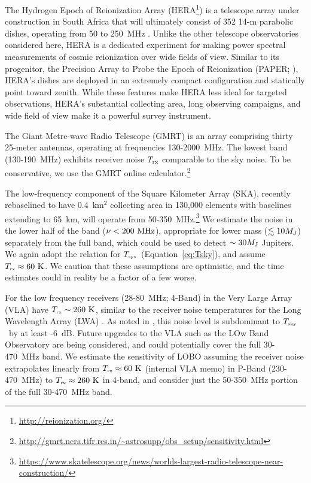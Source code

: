 \documentclass[iop,numberedappendix,apj,twocolappendix,]{emulateapj}
\newcommand{\Tsky}{\mbox{$T_{\mbox{\tiny sky}}$}}
\newcommand{\Tsys}{\mbox{$T_{\mbox{\tiny sys}}$}}
\newcommand{\Trx}{\mbox{$T_{\mbox{\tiny rx}}$}}
\begin{document}
The Hydrogen Epoch of Reionization Array (HERA\footnote{\url{http://reionization.org/}}) is a telescope array under construction in South Africa that will ultimately consist of 352 14-m parabolic dishes, operating from 50 to 250~MHz \citep{pober_et_al2014}.
Unlike the other telescope observatories considered here, HERA is a dedicated experiment for making power spectral measurements of cosmic reionization over wide fields of view.
Similar to its progenitor, the Precision Array to Probe the Epoch of Reionization (PAPER; \citealt{parsons_et_al2010}), HERA's dishes are deployed in an extremely compact configuration \citep{parsons_et_al2012} and statically point toward zenith.
While these features make HERA less ideal for targeted observations, HERA's substantial collecting area, long observing campaigns, and wide field of view make it a powerful survey instrument.

The Giant Metre-wave Radio Telescope (GMRT) is an array comprising thirty 25-meter antennas, operating at frequencies 130-2000~MHz.
The lowest band (130-190~MHz) exhibits receiver noise $T_{\rm rx}$ comparable to the sky noise.
To be conservative, we use the GMRT online calculator.\footnote{\url{http://gmrt.ncra.tifr.res.in/~astrosupp/obs\_setup/sensitivity.html}}


The low-frequency component of the Square Kilometer Array (SKA), recently rebaselined to have 0.4~km$^2$ collecting area in 130,000 elements with baselines extending to 65~km, will operate from 50-350~MHz.\footnote{\url{https://www.skatelescope.org/news/worlds-largest-radio-telescope-near-construction/}}
We estimate the noise in the lower half of the band ($\nu<200~\rm MHz$), appropriate for lower mass ($\lesssim 10 M_{\rm J}$) separately from the full band, which could be used to detect $\sim 30 M_{\rm J}$ Jupiters.
We again adopt the \cite{Rogers+Bowman2008} relation for \Tsys\ (Equation~\ref{eq:Tsky}), and assume $\Trx \approx 60~\rm K$.
We caution that these assumptions are optimistic, and the time estimates could in reality be a factor of a few worse.

For the low frequency receivers (28-80~MHz; 4-Band) in the Very Large Array (VLA) have $\Trx \sim 260~\rm K$, similar to the receiver noise temperatures for the Long Wavelength Array (LWA) \citep{Hicks2012}.  As noted in \citep{Hicks2012}, this noise level is subdominant to \Tsky\ by at least -6~dB.
Future upgrades to the VLA such as the LOw Band Observatory \citep[LOBO][]{Kassim2015IAU} are being considered, and could potentially cover the full 30-470~MHz band.
We estimate the sensitivity of LOBO assuming the receiver noise extrapolates linearly from $\Trx \approx 60~\rm K$ (internal VLA memo) in P-Band (230-470~MHz) to $\Trx \approx 260~\rm K$ in 4-band, and consider just the 50-350~MHz portion of the full 30-470~MHz band.
\end{document}
